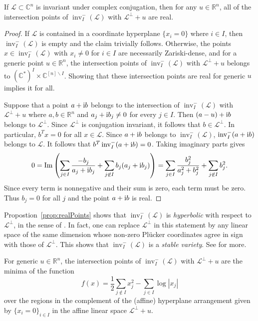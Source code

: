 \documentclass[ALCO,ThmDefs,Unicode,epreuves]{cedram}
\newcommand{\R}{\mathbb{R}}
\newcommand{\Cbb}{\mathbb{C}}
\newcommand{\cL}{\mathcal{L}}
\newcommand{\ii}{\textnormal{i}}
\DeclareMathOperator{\inv}{inv}
\DeclareMathOperator{\Imrm}{Im}
\begin{document}
\begin{prop}\label{prop:realPoints}
If $\cL \subset \Cbb^n$ is invariant under complex conjugation, 
then for any $u\in \R^n$, all of the intersection points of $\inv_I^-(\cL)$ with $\cL^{\perp} + u$
are real. 
\end{prop}

\begin{proof}
If $\cL$ is contained in a coordinate hyperplane $\{x_i=0\}$ where $i\in I$, then 
$\inv_I^-(\cL)$ is empty and the claim trivially follows. 
Otherwise, the points $x\in \inv_I^-(\cL)$ with $x_i\neq 0$ for $i\in I$ are necessarily Zariski-dense, 
and for a generic point $u\in \R^n$, the intersection points of $\inv_I^-(\cL)$ with $\cL^{\perp}+u$ belongs to $(\Cbb^*)^I\times \Cbb^{[n]\backslash I}$. 
Showing that these intersection points are real for generic $u$ implies it for all. 

Suppose that a point $a+\ii b$ belongs to the intersection of $\inv_I^-(\cL)$ with $\cL^{\perp}+u$
where $a,b\in \R^n$ and $a_j +\ii b_j \neq 0$ for every $j\in I$. 
Then $(a-u)+ \ii b$ belongs to $\cL^{\perp}$. Since $\cL^{\perp}$ is conjugation invariant, 
it follows that $b\in \cL^{\perp}$. In particular, $b^Tx=0$ for all $x\in \cL$. 
Since $a+\ii b$ belongs to $\inv_I^-(\cL)$, $\inv_I^-(a+\ii b)$ belongs to $\cL$. It follows that
$b^T \inv_I^-(a+\ii b) =0$. Taking imaginary parts gives 
\[
0  =  \Imrm\left( \sum_{j\in I} \frac{-b_j}{a_j + \ii b_j} + \sum_{j\not\in I}b_j(a_j + \ii b_j)\right) 
  =  \sum_{j\in I} \frac{b_j^2}{a_j^2 + b_j^2} + \sum_{j\not\in I}b_j^2.
\]
Since every term is nonnegative and their sum is zero, each term must be zero. Thus $b_j=0$ for all $j$ 
and the point $a+\ii b$ is real. 
\end{proof}

\begin{rema}
Propostion~\ref{prop:realPoints} shows that $\inv_I^-(\cL)$ is \emph{hyperbolic} with respect to $\cL^{\perp}$, 
in the sense of \cite{SV}. In fact, one can replace $\cL^{\perp}$ in this statement by any 
linear space of the same dimension whose non-zero Pl\"ucker coordinates agree in sign 
with those of $\cL^{\perp}$. This shows that $\inv_I^-(\cL)$ is a \emph{stable variety}. See \cite[Section~2]{KV} for more. 
\end{rema}


\begin{prop} \label{prop:minF}
For generic $u\in \R^n$, the intersection points of $\inv_I^-(\cL)$ with $\cL^{\perp} + u$ are the minima of the function 
\begin{equation}\label{eq:F}
f(x) =  \frac{1}{2}\sum_{j\not\in I} x_j^2 - \sum_{j\in I} \log|x_j|
\end{equation}
over the regions in the complement of the \textup{(}affine\textup{)} hyperplane arrangement given by $\{x_i=0\}_{i\in I}$ in the affine linear space $\cL^{\perp}+u$. 
\end{prop}
\end{document}
